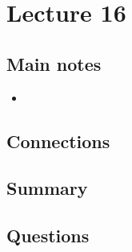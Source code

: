 \section{Lecture 16}

\subsection{Main notes}


\begin{itemize}
	\item
\end{itemize}


\subsection{Connections}


\subsection{Summary}


\subsection{Questions}
